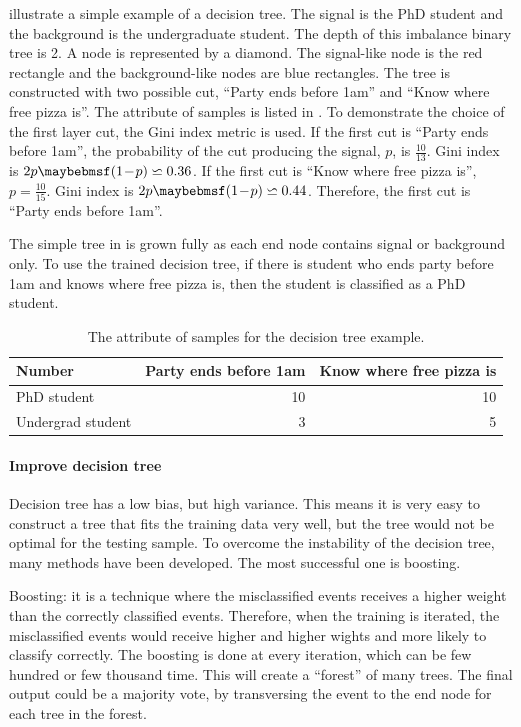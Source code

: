  illustrate a simple example of a decision tree. The signal is the PhD student and the background is the undergraduate student. The depth of this imbalance binary  tree is 2. A node is represented by a diamond.  The signal-like node is the red rectangle and the background-like nodes are blue rectangles. The tree is constructed with two possible cut, ``Party ends before 1am'' and ``Know where free pizza is''. The attribute of samples is listed in . To demonstrate the choice of the first layer cut, the Gini index metric is used. If the first cut is ``Party ends before 1am'', the probability of the cut producing the signal, $p$, is $\frac{10}{13}$. Gini index is $2p\parenths{1\!-\!p} \backsimeq 0.36 $. If the first cut is ``Know where free pizza is'', $p=\frac{10}{15}$. Gini index is $2p\parenths{1\!-\!p} \backsimeq 0.44 $. Therefore, the first cut is ``Party ends before 1am''.

The simple tree in  is grown fully as each end node contains signal or background only. To use the trained decision tree, if there is student who ends party before 1am and knows where free pizza is, then the student is classified as a PhD student.

\begin{table}[!tbp]\centering
\small
\begin{tabular}{lrr}
\hline \hline
Number & Party ends before 1am  & Know where free pizza is\\
\hline
PhD student & 10 & 10 \\
Undergrad student & 3 & 5 \\
\hline \hline
\end{tabular}
\caption
{The attribute of samples for the decision tree example.}
\label{tab:doubleHiggsDecisionTreeComic}
\end{table}

\paragraph{Improve decision tree}

Decision tree has a low bias, but high variance. This means it is very easy to construct a tree that fits the training data very well, but the tree would not be optimal for the testing sample. To overcome the instability of the decision tree, many methods have been developed. The most successful one is boosting.

Boosting: it is a technique where the misclassified events receives a higher weight than the correctly classified events. Therefore, when the training is iterated, the misclassified events would receive higher and higher wights and more likely to classify correctly. The boosting is done at every iteration, which can be few hundred or few thousand time. This will create a ``forest'' of many trees. The final output could be a majority vote, by transversing the event to the end node for each tree in the forest.

